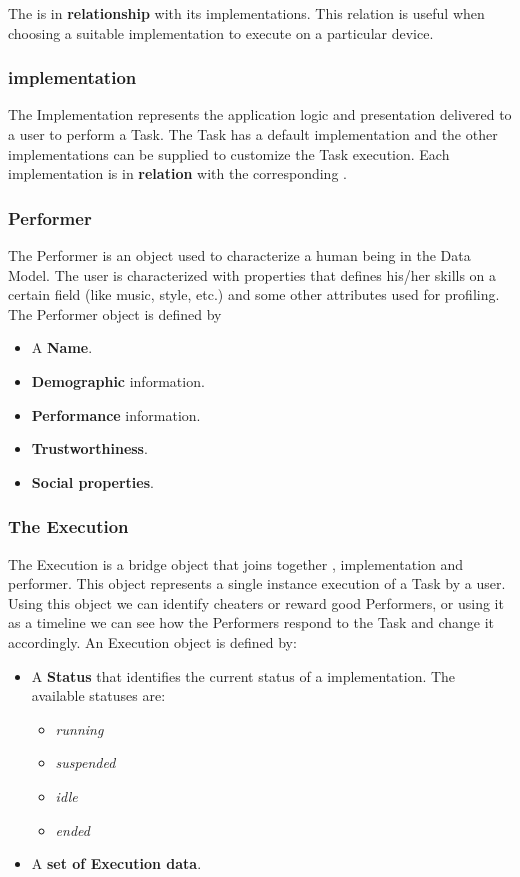 The \utask{} is in \textbf{relationship} with its \utask{} implementations. This
relation is useful when choosing a suitable implementation to execute on a
particular device.



\subsubsection{\utask{} implementation}
The \utask{} Implementation represents the application logic and presentation
delivered to a user to perform a Task. The Task has a default implementation
and the other implementations can be supplied to customize the Task execution.
Each \utask{} implementation is in \textbf{relation} with the corresponding
\utask{}.




\subsubsection{Performer}
The Performer is an object used to characterize a human being in the Data Model.
The user is characterized with properties that defines his/her skills on a
certain field (like music, style, etc.) and some other attributes used for
profiling. The Performer object is defined by
\begin{itemize}
    \item A \textbf{Name}.
    \item \textbf{Demographic} information.
    \item \textbf{Performance} information.
    \item \textbf{Trustworthiness}.
    \item \textbf{Social properties}.
\end{itemize}



\subsubsection{The Execution}
The Execution is a bridge object that joins together \utask{}, \utask{}
implementation and performer. This object represents a single instance execution
of a Task by a user. Using this object we can identify cheaters or reward good
Performers, or using it as a timeline we can see how the Performers respond to
the Task and change it accordingly. An Execution object is defined by:
\begin{itemize}
    \item A \textbf{Status} that identifies the current status of a \utask{}
    implementation. The available statuses are:
    \begin{itemize}
        \item \emph{running}
        \item \emph{suspended}
        \item \emph{idle}
        \item \emph{ended}
    \end{itemize}

    \item A \textbf{set of Execution data}.
\end{itemize}


